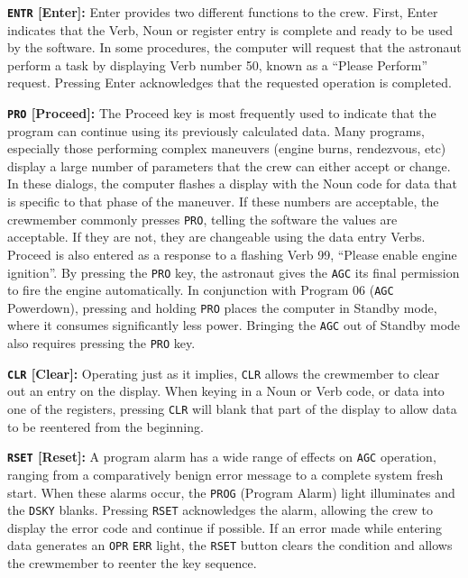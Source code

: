 \documentclass[refcap, oxford]{ahsan}
\begin{document}
\textbf{\texttt{ENTR} [Enter]:} Enter provides two different functions to the crew. First, Enter indicates that the Verb, Noun or register entry is complete and ready to be used by the software. In some procedures, the computer will request that the astronaut perform a task by displaying Verb number 50, known as a ``Please Perform'' request. Pressing Enter acknowledges that the requested operation is completed.

\textbf{\texttt{PRO} [Proceed]:} The Proceed key is most frequently used to indicate that the program can continue using its previously calculated data. Many programs, especially those performing complex maneuvers (engine burns, rendezvous, etc) display a large number of parameters that the crew can either accept or change. In these dialogs, the computer flashes a display with the Noun code for data that is specific to that phase of the maneuver. If these numbers are acceptable, the crewmember commonly presses \texttt{PRO}, telling the software the values are acceptable. If they are not, they are changeable using the data entry Verbs. Proceed is also entered as a response to a flashing Verb 99, ``Please enable engine ignition''. By pressing the \texttt{PRO} key, the astronaut gives the \texttt{AGC} its final permission to fire the engine automatically. In conjunction with Program 06 (\texttt{AGC} Powerdown), pressing and holding \texttt{PRO} places the computer in Standby mode, where it consumes significantly less power. Bringing the \texttt{AGC} out of Standby mode also requires pressing the \texttt{PRO} key.

\textbf{\texttt{CLR} [Clear]:} Operating just as it implies, \texttt{CLR} allows the crewmember to clear out an entry on the display. When keying in a Noun or Verb code, or data into one of the registers, pressing \texttt{CLR} will blank that part of the display to allow data to be reentered from the beginning.

\textbf{\texttt{RSET} [Reset]:} A program alarm has a wide range of effects on \texttt{AGC} operation, ranging from a comparatively benign error message to a complete system fresh start. When these alarms occur, the \texttt{PROG} (Program Alarm) light illuminates and the \texttt{DSKY} blanks. Pressing \texttt{RSET} acknowledges the alarm, allowing the crew to display
the error code and continue if possible. If an error made while entering data generates an \texttt{OPR} \texttt{ERR} light, the \texttt{RSET} button clears the condition and allows the crewmember to reenter the key sequence.
\end{document}
